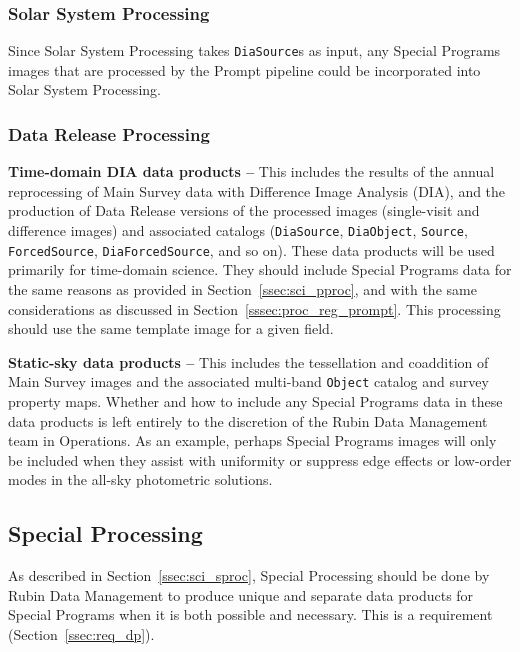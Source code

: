 \subsubsection{Solar System Processing}\label{sssec:proc_reg_ss}

Since Solar System Processing takes {\tt DiaSource}s as input, any 
Special Programs images that are processed by the Prompt pipeline
could be incorporated into Solar System Processing.

\subsubsection{Data Release Processing}\label{sssec:proc_reg_dr}

\textbf{Time-domain DIA data products --}
This includes the results of the annual reprocessing of Main Survey data with 
Difference Image Analysis (DIA), and the production of Data Release
versions of the processed images (single-visit and difference images)
and associated catalogs ({\tt DiaSource}, {\tt DiaObject}, {\tt Source},
{\tt ForcedSource}, {\tt DiaForcedSource}, and so on).
These data products will be used primarily for time-domain science.
They should include Special Programs data for the same reasons as
provided in Section~\ref{ssec:sci_pproc}, and with the same 
considerations as discussed in Section~\ref{sssec:proc_reg_prompt}.
This processing should use the same template image for a given field.

\textbf{Static-sky data products --}
This includes the tessellation and coaddition of Main Survey images
and the associated multi-band {\tt Object} catalog and survey property maps.
Whether and how to include any Special Programs data in these data products
is left entirely to the discretion of the Rubin Data Management team in Operations.
As an example, perhaps Special Programs images will only be included when they 
assist with uniformity or suppress edge effects or low-order modes in the 
all-sky photometric solutions.

\subsection{Special Processing}\label{ssec:proc_special}

As described in Section~\ref{ssec:sci_sproc}, 
Special Processing should be done by Rubin Data Management to 
produce unique and separate data products
for Special Programs when it is both possible and necessary.
This is a requirement (Section~\ref{ssec:req_dp}).

